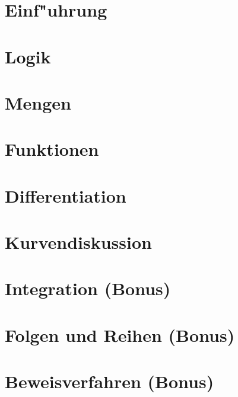 \documentclass[12pt,a4paper,titlepage]{scrartcl}
\newcommand{\psection}[1]{\pagebreak\section{#1}}
\begin{document}

\clearpage

\psection{Einf"uhrung}


\psection{Logik}


\psection{Mengen}


\psection{Funktionen}


\psection{Differentiation}


\psection{Kurvendiskussion}


\psection{Integration (Bonus)}


\psection{Folgen und Reihen (Bonus)}


\psection{Beweisverfahren (Bonus)}

\end{document}
